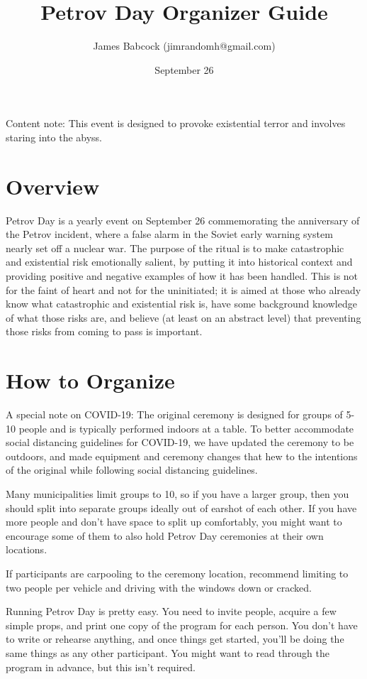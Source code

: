 \documentclass{article}
\title{Petrov Day Organizer Guide}
\author{James Babcock (jimrandomh@gmail.com)}
\date{September 26}
\begin{document}
\maketitle

Content note: This event is designed to provoke existential terror and involves
staring into the abyss.

\section{Overview}

Petrov Day is a yearly event on September 26 commemorating the anniversary of
the Petrov incident, where a false alarm in the Soviet early warning system
nearly set off a nuclear war. The purpose of the ritual is to make catastrophic
and existential risk emotionally salient, by putting it into historical context
and providing positive and negative examples of how it has been handled. This
is not for the faint of heart and not for the uninitiated; it is aimed at those
who already know what catastrophic and existential risk is, have some
background knowledge of what those risks are, and believe (at least on an
abstract level) that preventing those risks from coming to pass is important.

\section{How to Organize}

A special note on COVID-19: The original ceremony is designed for groups of
5-10 people and is typically performed indoors at a table. To better
accommodate social distancing guidelines for COVID-19, we have updated the ceremony
to be outdoors, and made equipment and ceremony changes that hew to the
intentions of the original while following social distancing guidelines.

Many municipalities limit groups to 10, so if you have a larger group, then
you should split into separate groups ideally out of earshot of each other. If
you have more people and don't have space to split up comfortably, you might
want to encourage some of them to also hold Petrov Day ceremonies at their own
locations.

If participants are carpooling to the ceremony location, recommend limiting to
two people per vehicle and driving with the windows down or cracked.

Running Petrov Day is pretty easy. You need to invite people, acquire a
few simple props, and print one copy of the program for each person. You don't
have to write or rehearse anything, and once things get started, you'll be
doing the same things as any other participant. You might want to read through
the program in advance, but this isn't required.
\end{document}
